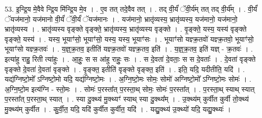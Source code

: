 \documentclass[17pt]{extarticle}
\begin{document}
53. इ॒न्द्रि॒य मे॒वैवे न्द्रि॒य मि॑न्द्रि॒य मे॒व । . ए॒व तत् तदे॒वैव तत् । . तद् वी॒र्यं॑ ॅवी॒र्य॑म् तत् तद् वी॒र्य᳚म् । . वी॒र्यं॑ ॅयज॑मानो॒ यज॑मानो वी॒र्यं॑ ॅवी॒र्यं॑ ॅयज॑मानः । . यज॑मानो॒ भ्रातृ॑व्यस्य॒ भ्रातृ॑व्यस्य॒ यज॑मानो॒ यज॑मानो॒ भ्रातृ॑व्यस्य । . भ्रातृ॑व्यस्य वृङ्क्ते वृङ्क्ते॒ भ्रातृ॑व्यस्य॒ भ्रातृ॑व्यस्य वृङ्क्ते । . वृ॒ङ्क्ते॒ यस्य॒ यस्य॑ वृङ्क्ते वृङ्क्ते॒ यस्य॑ । . यस्य॒ भूयाꣳ॑सो॒ भूयाꣳ॑सो॒ यस्य॒ यस्य॒ भूयाꣳ॑सः । . भूयाꣳ॑सो यज्ञ्क्र॒तवो॑ यज्ञ्क्र॒तवो॒ भूयाꣳ॑सो॒ भूयाꣳ॑सो यज्ञ्क्र॒तवः॑ । . य॒ज्ञ्॒क्र॒तव॒ इतीति॑ यज्ञ्क्र॒तवो॑ यज्ञ्क्र॒तव॒ इति॑ । . य॒ज्ञ्॒क्र॒तव॒ इति॑ यज्ञ् - क्र॒तवः॑ । . इत्या॑हु राहु॒ रिती त्या॑हुः । . आ॒हुः॒ स स आ॑हु राहुः॒ सः । . स दे॒वता॑ दे॒वताः॒ स स दे॒वताः᳚ । . दे॒वता॑ वृङ्क्ते वृङ्क्ते दे॒वता॑ दे॒वता॑ वृङ्क्ते । . वृ॒ङ्क्त॒ इतीति॑ वृङ्क्ते वृङ्क्त॒ इति॑ । . इति॒ यदि॒ यदीतीति॒ यदि॑ । . यद्य॑ग्निष्टो॒मो᳚ ऽग्निष्टो॒मो यदि॒ यद्य॑ग्निष्टो॒मः । . अ॒ग्नि॒ष्टो॒मः सोमः॒ सोमो॑ अग्निष्टो॒मो᳚ ऽग्निष्टो॒मः सोमः॑ । . अ॒ग्नि॒ष्टो॒म इत्य॑ग्नि - स्तो॒मः । . सोमः॑ प॒रस्ता᳚त् प॒रस्ता॒थ् सोमः॒ सोमः॑ प॒रस्ता᳚त् । . प॒रस्ता॒थ् स्याथ् स्यात् प॒रस्ता᳚त् प॒रस्ता॒थ् स्यात् । . स्या दु॒क्थ्य॑ मु॒क्थ्यꣳ॑ स्याथ् स्या दु॒क्थ्य᳚म् । . उ॒क्थ्य॑म् कुर्वीत कुर्वी तो॒क्थ्य॑ मु॒क्थ्य॑म् कुर्वीत । . कु॒र्वी॒त॒ यदि॒ यदि॑ कुर्वीत कुर्वीत॒ यदि॑ । . यद्यु॒क्थ्य॑ उ॒क्थ्यो॑ यदि॒ यद्यु॒क्थ्यः॑ । \newline
\end{document}
